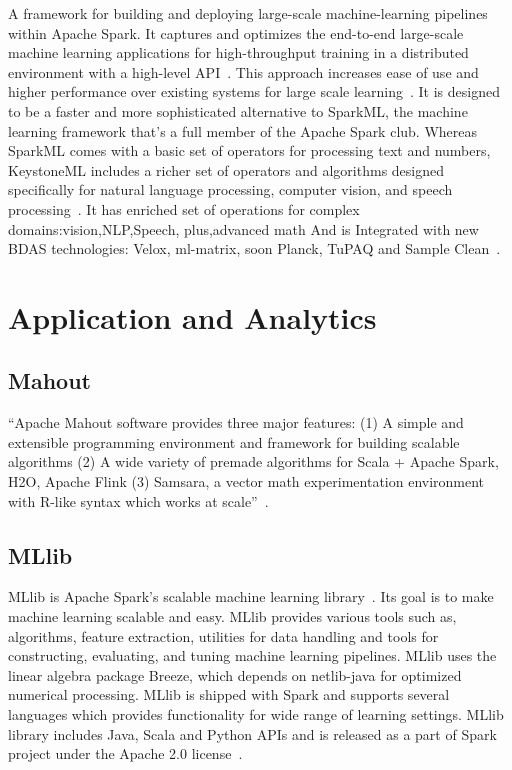 A framework for building and deploying large-scale machine-learning
pipelines within Apache Spark. It captures and optimizes the
end-to-end large-scale machine learning applications for
high-throughput training in a distributed environment with a
high-level API~\cite{sparks2016keystoneml}. This approach increases
ease of use and higher performance over existing systems for large
scale learning~\cite{sparks2016keystoneml}. It is designed to be a
faster and more sophisticated alternative to SparkML, the machine
learning framework that’s a full member of the Apache Spark
club. Whereas SparkML comes with a basic set of operators for
processing text and numbers, KeystoneML includes a richer set of
operators and algorithms designed specifically for natural language
processing, computer vision, and speech processing~\cite{building}. It
has enriched set of operations for complex domains:vision,NLP,Speech,
plus,advanced math And is Integrated with new BDAS technologies:
Velox, ml-matrix, soon Planck, TuPAQ and Sample Clean~\cite{spark}.

\section{Application and Analytics}
\label{S:o-application}

\subsection{Mahout}

``Apache Mahout software provides three major features: (1) A simple
and extensible programming environment and framework for building
scalable algorithms (2) A wide variety of premade algorithms for Scala
+ Apache Spark, H2O, Apache Flink (3) Samsara, a vector math
experimentation environment with R-like syntax which works at
scale''~\cite{www-mahout}.

    \pv


\subsection{MLlib}

MLlib is Apache Spark’s scalable machine learning
library~\cite{www-mllib}. Its goal is to make machine learning
scalable and easy. MLlib provides various tools such as, algorithms,
feature extraction, utilities for data handling and tools for
constructing, evaluating, and tuning machine learning pipelines. MLlib
uses the linear algebra package Breeze, which depends on netlib-java
for optimized numerical processing. MLlib is shipped with Spark and
supports several languages which provides functionality for wide range
of learning settings. MLlib library includes Java, Scala and Python
APIs and is released as a part of Spark project under the Apache 2.0
license~\cite{MLlib-article}.

